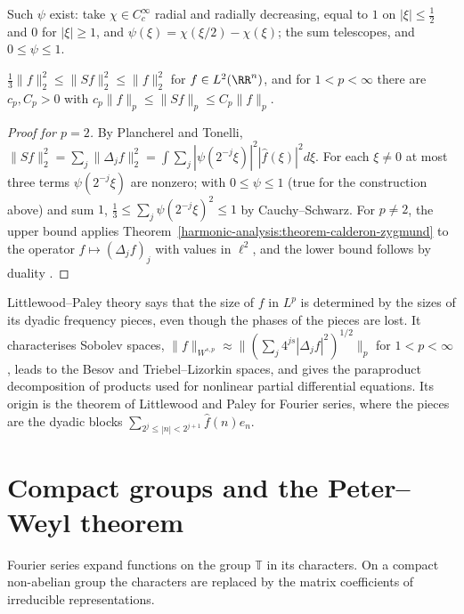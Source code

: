 Such $\psi$ exist: take $\chi \in C_c^\infty$ radial and radially decreasing, equal to $1$ on $|\xi| \leq \frac12$ and $0$ for $|\xi| \geq 1$, and $\psi(\xi) = \chi(\xi/2) - \chi(\xi)$; the sum telescopes, and $0 \leq \psi \leq 1$.

\begin{theorem}\label{harmonic-analysis:theorem-littlewood-paley}
$\frac13\|f\|_2^2 \leq \|Sf\|_2^2 \leq \|f\|_2^2$ for $f \in L^2(\RR^n)$, and for $1 < p < \infty$ there are $c_p, C_p > 0$ with $c_p\|f\|_p \leq \|Sf\|_p \leq C_p\|f\|_p$.
\end{theorem}

\begin{proof}[Proof for $p = 2$]
By Plancherel and Tonelli, $\|Sf\|_2^2 = \sum_j\|\Delta_jf\|_2^2 = \int\sum_j|\psi(2^{-j}\xi)|^2|\hat f(\xi)|^2d\xi$. For each $\xi \neq 0$ at most three terms $\psi(2^{-j}\xi)$ are nonzero; with $0 \leq \psi \leq 1$ (true for
the construction above) and sum $1$, $\frac13 \leq \sum_j\psi(2^{-j}\xi)^2 \leq 1$ by Cauchy--Schwarz. For $p \neq 2$, the upper bound applies Theorem~\ref{harmonic-analysis:theorem-calderon-zygmund} to the operator
$f \mapsto (\Delta_jf)_j$ with values in $\ell^2$, and the lower bound follows by duality \cite{grafakos-classical}.
\end{proof}

\begin{remark}\label{harmonic-analysis:remark-littlewood-paley}
Littlewood--Paley theory says that the size of $f$ in $L^p$ is determined by the sizes of its dyadic frequency pieces, even though the phases of the pieces are lost. It characterises Sobolev spaces,
$\|f\|_{W^{s,p}} \approx \|(\sum_j4^{js}|\Delta_jf|^2)^{1/2}\|_p$ for $1 < p < \infty$, leads to the Besov and Triebel--Lizorkin spaces, and gives the paraproduct decomposition of products used for nonlinear partial
differential equations. Its origin is the theorem of Littlewood and Paley for Fourier series, where the pieces are the dyadic blocks $\sum_{2^j \leq |n| < 2^{j+1}}\hat f(n)e_n$.
\end{remark}

\section{Compact groups and the Peter--Weyl theorem}\label{harmonic-analysis:section-compact-groups}

Fourier series expand functions on the group $\mathbb{T}$ in its characters. On a compact non-abelian group the characters are replaced by the matrix coefficients of irreducible representations.

